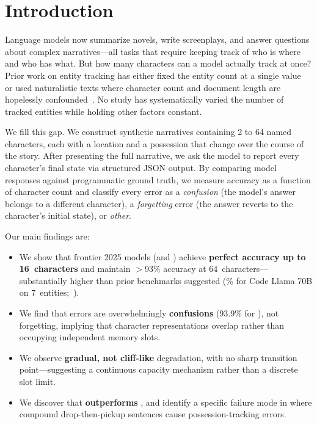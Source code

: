 \section{Introduction}
\label{sec:intro}

Language models now summarize novels, write screenplays, and answer questions about complex narratives---all tasks that require keeping track of who is where and who has what.
But how many characters can a model actually track at once?
Prior work on entity tracking has either fixed the entity count at a single value~\citep{kim2023entity} or used naturalistic texts where character count and document length are hopelessly confounded~\citep{hamilton2025tldm}.
No study has systematically varied the number of tracked entities while holding other factors constant.

We fill this gap.
We construct synthetic narratives containing 2 to 64 named characters, each with a location and a possession that change over the course of the story.
After presenting the full narrative, we ask the model to report every character's final state via structured JSON output.
By comparing model responses against programmatic ground truth, we measure accuracy as a function of character count and classify every error as a \emph{confusion} (the model's answer belongs to a different character), a \emph{forgetting} error (the answer reverts to the character's initial state), or \emph{other}.

Our main findings are:
\begin{itemize}[leftmargin=*,itemsep=0pt,topsep=0pt]
\item We show that frontier 2025 models (\gptfull and \gptmini) achieve \textbf{perfect accuracy up to 16~characters} and maintain $>$93\% accuracy at 64~characters---substantially higher than prior benchmarks suggested (\% for Code Llama 70B on 7~entities;~\citealt{kim2024code}).
\item We find that errors are overwhelmingly \textbf{confusions} (93.9\% for \gptmini), not forgetting, implying that character representations overlap rather than occupying independent memory slots.
\item We observe \textbf{gradual, not cliff-like} degradation, with no sharp transition point---suggesting a continuous capacity mechanism rather than a discrete slot limit.
\item We discover that \gptmini \textbf{outperforms} \gptfull, and identify a specific failure mode in \gptfull where compound drop-then-pickup sentences cause possession-tracking errors.
\end{itemize}

